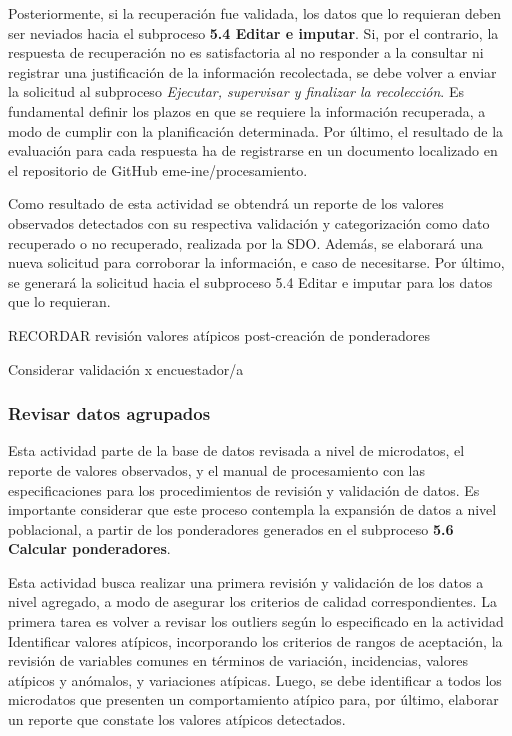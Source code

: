 \documentclass[
]{article}
\begin{document}
Posteriormente, si la recuperación fue validada, los datos que lo requieran deben ser neviados hacia el subproceso \textbf{5.4 Editar e imputar}. Si, por el contrario, la respuesta de recuperación no es satisfactoria al no responder a la consultar ni registrar una justificación de la información recolectada, se debe volver a enviar la solicitud al subproceso \emph{Ejecutar, supervisar y finalizar la recolección}. Es fundamental definir los plazos en que se requiere la información recuperada, a modo de cumplir con la planificación determinada. Por último, el resultado de la evaluación para cada respuesta ha de registrarse en un documento localizado en el repositorio de GitHub eme-ine/procesamiento.

Como resultado de esta actividad se obtendrá un reporte de los valores observados detectados con su respectiva validación y categorización como dato recuperado o no recuperado, realizada por la SDO. Además, se elaborará una nueva solicitud para corroborar la información, e caso de necesitarse. Por último, se generará la solicitud hacia el subproceso 5.4 Editar e imputar para los datos que lo requieran.

RECORDAR revisión valores atípicos post-creación de ponderadores

Considerar validación x encuestador/a

\hypertarget{revisar-datos-agrupados}{%
\subsubsection{Revisar datos agrupados}\label{revisar-datos-agrupados}}

Esta actividad parte de la base de datos revisada a nivel de microdatos, el reporte de valores observados, y el manual de procesamiento con las especificaciones para los procedimientos de revisión y validación de datos. Es importante considerar que este proceso contempla la expansión de datos a nivel poblacional, a partir de los ponderadores generados en el subproceso \textbf{5.6 Calcular ponderadores}.

Esta actividad busca realizar una primera revisión y validación de los datos a nivel agregado, a modo de asegurar los criterios de calidad correspondientes. La primera tarea es volver a revisar los outliers según lo especificado en la actividad Identificar valores atípicos, incorporando los criterios de rangos de aceptación, la revisión de variables comunes en términos de variación, incidencias, valores atípicos y anómalos, y variaciones atípicas. Luego, se debe identificar a todos los microdatos que presenten un comportamiento atípico para, por último, elaborar un reporte que constate los valores atípicos detectados.
\end{document}

